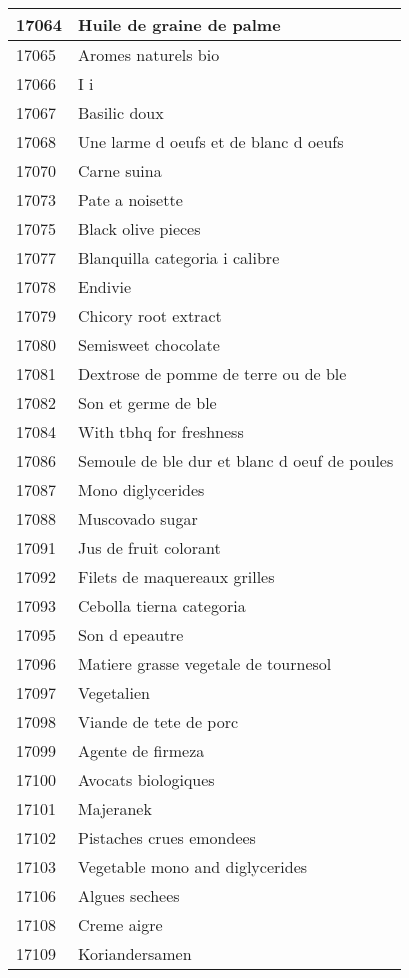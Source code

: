 \begin{longtable}{|l|l|}
17064 & Huile de graine de palme \\ \hline 
17065 & Aromes naturels bio \\ \hline 
17066 & I i \\ \hline 
17067 & Basilic doux \\ \hline 
17068 & Une larme d oeufs et de blanc d oeufs \\ \hline 
17070 & Carne suina \\ \hline 
17073 & Pate a noisette \\ \hline 
17075 & Black olive pieces \\ \hline 
17077 & Blanquilla categoria i calibre \\ \hline 
17078 & Endivie \\ \hline 
17079 & Chicory root extract \\ \hline 
17080 & Semisweet chocolate \\ \hline 
17081 & Dextrose de pomme de terre ou de ble \\ \hline 
17082 & Son et germe de ble \\ \hline 
17084 & With tbhq for freshness \\ \hline 
17086 & Semoule de ble dur et blanc d oeuf de poules \\ \hline 
17087 & Mono diglycerides \\ \hline 
17088 & Muscovado sugar \\ \hline 
17091 & Jus de fruit colorant \\ \hline 
17092 & Filets de maquereaux grilles \\ \hline 
17093 & Cebolla tierna categoria \\ \hline 
17095 & Son d epeautre \\ \hline 
17096 & Matiere grasse vegetale de tournesol \\ \hline 
17097 & Vegetalien \\ \hline 
17098 & Viande de tete de porc \\ \hline 
17099 & Agente de firmeza \\ \hline 
17100 & Avocats biologiques \\ \hline 
17101 & Majeranek \\ \hline 
17102 & Pistaches crues emondees \\ \hline 
17103 & Vegetable mono and diglycerides \\ \hline 
17106 & Algues sechees \\ \hline 
17108 & Creme aigre \\ \hline 
17109 & Koriandersamen \\ \hline 

\end{longtable}
